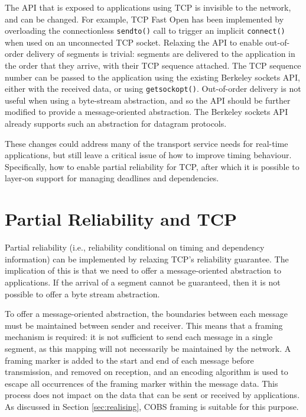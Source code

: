 \documentclass{sig-alternate-05-2015}
\begin{document}
The API that is exposed to applications using TCP is invisible to the
network, and can be changed.  For example, TCP Fast Open \cite{RFC7413} 
has been implemented by overloading the connectionless \texttt{sendto()} 
call to trigger an implicit \texttt{connect()} when used on an unconnected
TCP socket.
Relaxing the API to enable out-of-order
delivery of segments is trivial: segments are delivered to the application
in the order that they arrive, with their TCP sequence attached. The TCP
sequence number can be passed to the application using the existing
Berkeley sockets API, either with the received data, or using
\texttt{getsockopt()}. Out-of-order delivery is not useful when using a
byte-stream abstraction, and so the API should be further modified to
provide a message-oriented abstraction. The Berkeley sockets API already
supports such an abstraction for datagram protocols.

These changes could address many of the transport service needs for
real-time applications, but still leave a critical issue of how to improve
timing behaviour. Specifically, how to enable partial reliability for TCP,
after which it is possible to layer-on support for managing deadlines and
dependencies.

\section{Partial Reliability and TCP}
\label{sec:partial}

Partial reliability (i.e., reliability conditional on timing and dependency
information) can be implemented by relaxing TCP's reliability guarantee.
The implication of this is that we need to offer a message-oriented
abstraction to applications. If the arrival of a segment cannot be
guaranteed, then it is not possible to offer a byte stream abstraction.

To offer a message-oriented abstraction, the boundaries between each
message must be maintained between sender and receiver. This means that a
framing mechanism is required: it is not sufficient to send each message in
a single segment, as this mapping will not necessarily be maintained by the
network. A framing marker is added to the start and end of each message
before transmission, and removed on reception, and an encoding algorithm 
is used to escape all occurrences of the framing marker within the message
data. This process does not impact on the data that can be sent or received
by applications. As discussed in Section \ref{sec:realising}, COBS framing
\cite{CB97COBS} is suitable for this purpose.
\end{document}
